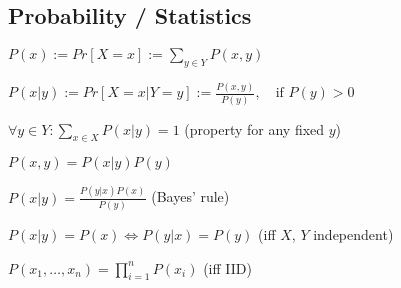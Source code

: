 \subsection*{Probability / Statistics}
\begin{inparaitem}
	\item $P(x) := Pr[X = x] := \sum_{y \in Y} P(x, y)$
	\item $P(x|y) := Pr[X = x | Y = y] := \frac{P(x,y)}{P(y)},\quad \text{if } P(y) > 0$
	\item $\forall y \in Y: \sum_{x \in X} P(x|y) = 1$ (property for any fixed $y$)
	\item $P(x, y) = P(x|y) P(y)$
	\item $P(x|y) = \frac{P(y|x)P(x)}{P(y)}$ (Bayes' rule)
	\item $P(x|y) = P(x) \Leftrightarrow P(y|x) = P(y)$ (iff $X$, $Y$ independent)
	\item $P(x_1, \ldots, x_n) = \prod_{i=1}^n P(x_i)$ (iff IID)
\end{inparaitem}